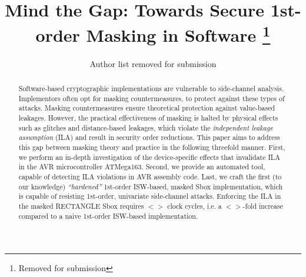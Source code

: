 \documentclass[runningheads, a4paper, 10pt]{llncs}
\begin{document}



\title{Mind the Gap: Towards Secure 1st-order Masking in Software
\thanks{
Removed for submission
}}


\author{Author list removed for submission}


\maketitle

\begin{abstract}
Software-based cryptographic implementations are vulnerable to side-channel analysis. 
Implementors often opt for masking countermeasures, to protect against these types of attacks.
Masking countermeasures ensure theoretical protection against value-based leakages. However, the practical effectiveness of masking is halted by 
physical effects such as glitches and distance-based leakages, which violate the \emph{independent leakage assumption} (ILA) and result in security order reductions. This paper aims to address this gap between masking theory and practice in the following threefold manner. First, we perform an in-depth investigation of the device-specific effects that invalidate ILA in the AVR microcontroller ATMega163. Second, we provide an automated tool, capable of detecting ILA violations in AVR assembly code. Last, we craft the first (to our knowledge) \emph{``hardened''} 1st-order ISW-based, masked Sbox implementation, which is capable of resisting 1st-order, univariate side-channel attacks. Enforcing the ILA in the masked RECTANGLE Sbox requires $<>$ clock cycles, i.e. a $<>$-fold increase compared  to a naive 1st-order ISW-based implementation. 


\end{abstract}










\end{document}

